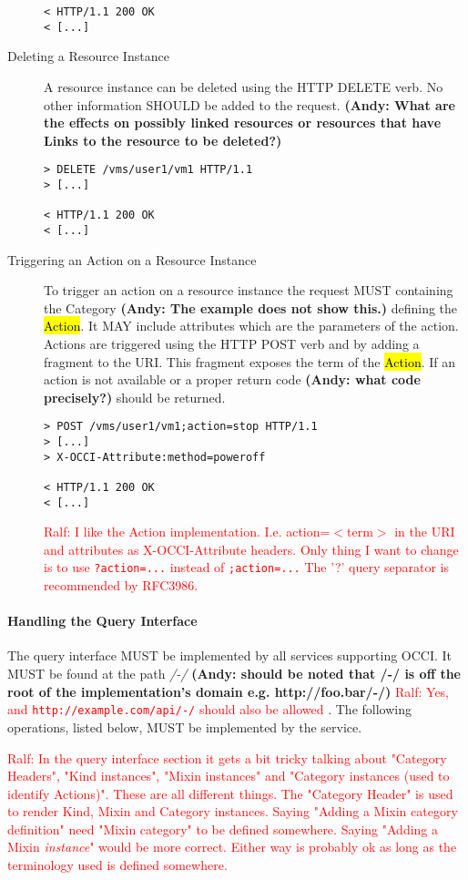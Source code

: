 \documentclass[10pt,a4paper]{article}
\newcommand{\ralf}[1]{\textcolor{red}{Ralf: #1}}
\begin{document}
\begin{description}
\begin{verbatim}
< HTTP/1.1 200 OK
< [...]
\end{verbatim}

\item[Deleting a Resource Instance] A resource instance can be deleted
  using the HTTP DELETE verb. No other information SHOULD be added to
  the request. \textbf{(Andy: What are the effects on possibly linked resources 
  or resources that have Links to the resource to be deleted?)}
\begin{verbatim}
> DELETE /vms/user1/vm1 HTTP/1.1
> [...]

< HTTP/1.1 200 OK
< [...]
\end{verbatim}

\item[Triggering an Action on a Resource Instance] To trigger an
  action on a resource instance the request MUST containing the Category 
  \textbf{(Andy: The example does not show this.)}
  defining the \hl{Action}. It MAY include attributes which are the
  parameters of the action. Actions are triggered using the HTTP POST
  verb and by adding a fragment to the URI. This fragment exposes the
  term of the \hl{Action}. If an action is not available or a proper 
  return code \textbf{(Andy: what code precisely?)} should be returned.
\begin{verbatim}
> POST /vms/user1/vm1;action=stop HTTP/1.1
> [...]
> X-OCCI-Attribute:method=poweroff

< HTTP/1.1 200 OK
< [...]
\end{verbatim}

\ralf{I like the Action implementation. I.e. action=$<$term$>$ in the URI and
attributes as X-OCCI-Attribute headers. Only thing I want to change is to use
{\tt ?action=...} instead of {\tt ;action=...} The '?' query separator is recommended by
RFC3986.}
\end{description}

\paragraph{Handling the Query Interface}
The query interface MUST be implemented by all services supporting
OCCI. It MUST be found at the path \emph{/-/} \textbf{(Andy: should be 
noted that /-/ is off the root of the implementation's domain e.g. http://foo.bar/-/)}
\ralf{Yes, and {\tt http://example.com/api/-/} should also be allowed}
. The following
operations, listed below, MUST be implemented by the service.

\ralf{In the query interface section it gets a bit tricky talking about
"Category Headers", "Kind instances", "Mixin instances" and "Category instances
(used to identify Actions)". These are all different things. The "Category
Header" is used to render Kind, Mixin and Category instances.  Saying "Adding a
Mixin category definition" need "Mixin category" to be defined somewhere.
Saying "Adding a Mixin {\em instance}" would be more correct.  Either way is
probably ok as long as the terminology used is defined somewhere.}
\end{document}
